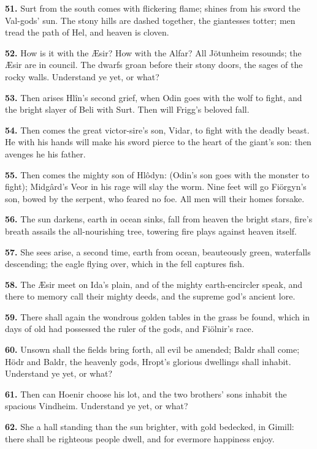 \textbf{51.} Surt from the south comes with flickering flame; shines from his
sword the Val-gods' sun. The stony hills are dashed together, the
giantesses totter; men tread the path of Hel, and heaven is cloven.

\textbf{52.} How is it with the Æsir? How with the Alfar? All Jötunheim
resounds; the Æsir are in council. The dwarfs groan before their stony
doors, the sages of the rocky walls. Understand ye yet, or what?

\textbf{53.} Then arises Hlîn's second grief, when Odin goes with the wolf to
fight, and the bright slayer of Beli with Surt. Then will Frigg's
beloved fall.

\textbf{54.} Then comes the great victor-sire's son, Vidar, to fight with the
deadly beast. He with his hands will make his sword pierce to the
heart of the giant's son: then avenges he his father.

\textbf{55.} Then comes the mighty son of Hlôdyn: (Odin's son goes with the
monster to fight); Midgârd's Veor in his rage will slay the worm. Nine
feet will go Fiörgyn's son, bowed by the serpent, who feared no foe.
All men will their homes forsake.

\textbf{56.} The sun darkens, earth in ocean sinks, fall from heaven the
bright stars, fire's breath assails the all-nourishing tree, towering
fire plays against heaven itself.

\textbf{57.} She sees arise, a second time, earth from ocean, beauteously
green, waterfalls descending; the eagle flying over, which in the fell
captures fish.

\textbf{58.} The Æsir meet on Ida's plain, and of the mighty earth-encircler
speak, and there to memory call their mighty deeds, and the supreme
god's ancient lore.

\textbf{59.} There shall again the wondrous golden tables in the grass be
found, which in days of old had possessed the ruler of the gods, and
Fiölnir's race.

\textbf{60.} Unsown shall the fields bring forth, all evil be amended; Baldr
shall come; Hödr and Baldr, the heavenly gods, Hropt's glorious
dwellings shall inhabit. Understand ye yet, or what?

\textbf{61.} Then can Hoenir choose his lot, and the two brothers' sons
inhabit the spacious Vindheim. Understand ye yet, or what?

\textbf{62.} She a hall standing than the sun brighter, with gold bedecked,
in Gimill: there shall be righteous people dwell, and for evermore
happiness enjoy.

